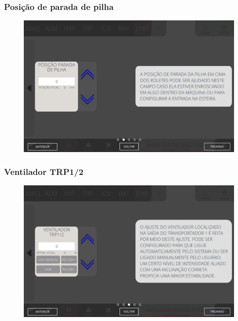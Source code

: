 \newpage
\thispagestyle{fancy}
\vspace*{40 pt}
\subsubsection{\small{Posição de parada de pilha}} \label{sec:telaAjustesEmpilhadorPosicaoParadaPilha}
\vspace*{\fill}
\begin{figure}[h]
    \centering
    \includegraphics[width=576 px,height=360 px]{src/imagesICV/08-stacker/settings/14.png}
\end{figure}
\vspace*{\fill}

\newpage
\thispagestyle{fancy}
\vspace*{40 pt}
\subsubsection{\small{Ventilador TRP1/2}} \label{sec:telaAjustesEmpilhadorVentiladorTRP12}
\vspace*{\fill}
\begin{figure}[h]
    \centering
    \includegraphics[width=576 px,height=360 px]{src/imagesICV/08-stacker/settings/15.png}
\end{figure}
\vspace*{\fill}

